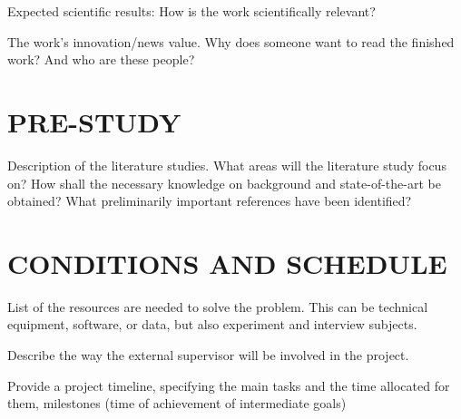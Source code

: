 \documentclass{sigchi}
\begin{document}
Expected scientific results: How is the work scientifically relevant?

The work's innovation/news value. Why does someone want to read the finished work? And who are these people?

\section{PRE-STUDY}
Description of the literature studies. What areas will the literature study focus on? How shall the necessary knowledge on background and state-of-the-art be obtained? What preliminarily important references have been identified?

\section{CONDITIONS AND SCHEDULE}
List of the resources are needed to solve the problem. This can be technical equipment, software, or data, but also experiment and interview subjects.

Describe the way the external supervisor will be involved in the project.

Provide a project timeline, specifying the main tasks and the time allocated for them, milestones (time of achievement of intermediate goals)



\end{document}
